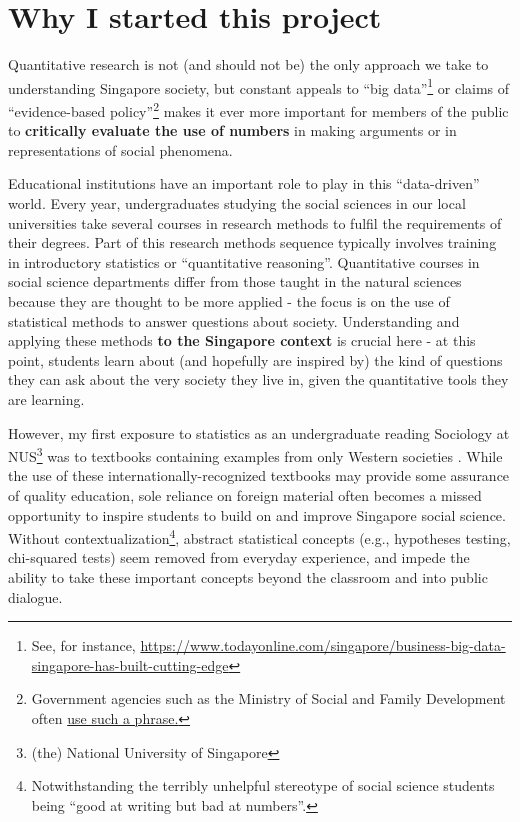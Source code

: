\documentclass[openany]{book}
\let\rmarkdownfootnote\footnote%
\def\footnote{\protect\rmarkdownfootnote}
\begin{document}
\section*{Why I started this project}\label{why-i-started-this-project}

Quantitative research is not (and should not be) the only approach we
take to understanding Singapore society, but constant appeals to ``big
data''\footnote{See, for instance,
  \url{https://www.todayonline.com/singapore/business-big-data-singapore-has-built-cutting-edge}}
or claims of ``evidence-based policy''\footnote{Government agencies such
  as the Ministry of Social and Family Development often
  \href{https://www.msf.gov.sg/about-MSF/our-people/Divisions-at-MSF/Family-Development-and-Support/Pages/default.aspx}{use
  such a phrase.}} makes it ever more important for members of the
public to \textbf{critically evaluate the use of numbers} in making
arguments or in representations of social phenomena.

Educational institutions have an important role to play in this
``data-driven'' world. Every year, undergraduates studying the social
sciences in our local universities take several courses in research
methods to fulfil the requirements of their degrees. Part of this
research methods sequence typically involves training in introductory
statistics or ``quantitative reasoning''. Quantitative courses in social
science departments differ from those taught in the natural sciences
because they are thought to be more applied - the focus is on the use of
statistical methods to answer questions about society. Understanding and
applying these methods \textbf{to the Singapore context} is crucial here
- at this point, students learn about (and hopefully are inspired by)
the kind of questions they can ask about the very society they live in,
given the quantitative tools they are learning.

However, my first exposure to statistics as an undergraduate reading
Sociology at NUS\footnote{(the) National University of Singapore} was to
textbooks containing examples from only Western societies
\citep[e.g.,][]{agresti_statistical_2009, treiman_quantitative_2009}.
While the use of these internationally-recognized textbooks may provide
some assurance of quality education, sole reliance on foreign material
often becomes a missed opportunity to inspire students to build on and
improve Singapore social science. Without contextualization\footnote{Notwithstanding
  the terribly unhelpful stereotype of social science students being
  ``good at writing but bad at numbers''.}, abstract statistical
concepts (e.g., hypotheses testing, chi-squared tests) seem removed from
everyday experience, and impede the ability to take these important
concepts beyond the classroom and into public dialogue.
\end{document}
